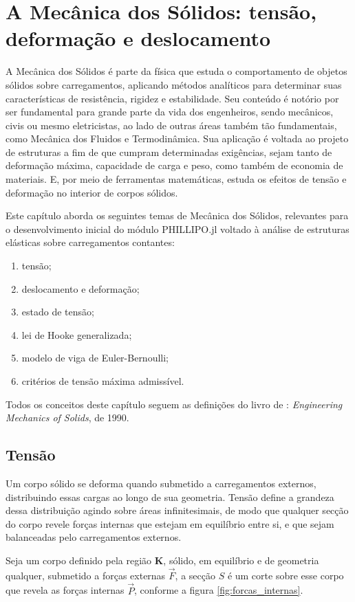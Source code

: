 \chapter{A Mecânica dos Sólidos: tensão, deformação e deslocamento}

A Mecânica dos Sólidos é parte da física que estuda o comportamento de objetos sólidos sobre carregamentos, aplicando métodos analíticos para determinar suas características de resistência, rigidez e estabilidade. Seu conteúdo é notório por ser fundamental para grande parte da vida dos engenheiros, sendo mecânicos, civis ou mesmo eletricistas, ao lado de outras áreas também tão fundamentais, como Mecânica dos Fluidos e Termodinâmica. Sua aplicação é voltada ao projeto de estruturas a fim de que cumpram determinadas exigências, sejam tanto de deformação máxima, capacidade de carga e peso, como também de economia de materiais. E, por meio de ferramentas matemáticas, estuda os efeitos de tensão e deformação no interior de corpos sólidos. \cite{popov}

Este capítulo aborda os seguintes temas de Mecânica dos Sólidos, relevantes para o desenvolvimento inicial do módulo PHILLIPO.jl voltado à análise de estruturas elásticas sobre carregamentos contantes:
\begin{enumerate}
    \item tensão;
    \item deslocamento e deformação;
    \item estado de tensão;
    \item lei de Hooke generalizada;
    \item modelo de viga de Euler-Bernoulli;
    \item critérios de tensão máxima admissível.
\end{enumerate}

Todos os conceitos deste capítulo seguem as definições do livro de \citeauthor{popov}: \emph{Engineering Mechanics of Solids}, de 1990.

\section{Tensão}

Um corpo sólido se deforma quando submetido a carregamentos externos, distribuindo essas cargas ao longo de sua geometria. Tensão define a grandeza dessa distribuição agindo sobre áreas infinitesimais, de modo que qualquer secção do corpo revele forças internas que estejam em equilíbrio entre si, e que sejam balanceadas pelo carregamentos externos. \cite{popov}

Seja um corpo definido pela região $\bm{K}$, sólido, em equilíbrio e de geometria qualquer, submetido a forças externas $\vec{F}$, a secção $S$ é um corte sobre esse corpo que revela as forças internas $\vec{P}$, conforme a figura \ref{fig:forcas_internas}.

